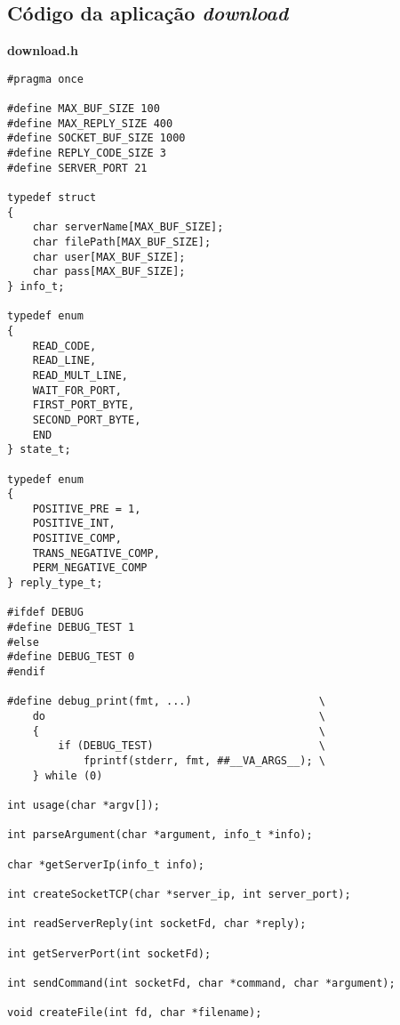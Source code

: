 \documentclass{article}
\begin{document}
\subsection{Código da aplicação \textit{download}}
\textbf{download.h}
\begin{verbatim}
#pragma once

#define MAX_BUF_SIZE 100
#define MAX_REPLY_SIZE 400
#define SOCKET_BUF_SIZE 1000
#define REPLY_CODE_SIZE 3
#define SERVER_PORT 21

typedef struct
{
    char serverName[MAX_BUF_SIZE];
    char filePath[MAX_BUF_SIZE];
    char user[MAX_BUF_SIZE];
    char pass[MAX_BUF_SIZE];
} info_t;

typedef enum
{
    READ_CODE,
    READ_LINE,
    READ_MULT_LINE,
    WAIT_FOR_PORT,
    FIRST_PORT_BYTE,
    SECOND_PORT_BYTE,
    END
} state_t;

typedef enum
{
    POSITIVE_PRE = 1,
    POSITIVE_INT,
    POSITIVE_COMP,
    TRANS_NEGATIVE_COMP,
    PERM_NEGATIVE_COMP
} reply_type_t;

#ifdef DEBUG
#define DEBUG_TEST 1
#else
#define DEBUG_TEST 0
#endif

#define debug_print(fmt, ...)                    \
    do                                           \
    {                                            \
        if (DEBUG_TEST)                          \
            fprintf(stderr, fmt, ##__VA_ARGS__); \
    } while (0)

int usage(char *argv[]);

int parseArgument(char *argument, info_t *info);

char *getServerIp(info_t info);

int createSocketTCP(char *server_ip, int server_port);

int readServerReply(int socketFd, char *reply);

int getServerPort(int socketFd);

int sendCommand(int socketFd, char *command, char *argument);

void createFile(int fd, char *filename);
\end{verbatim}
\end{document}
